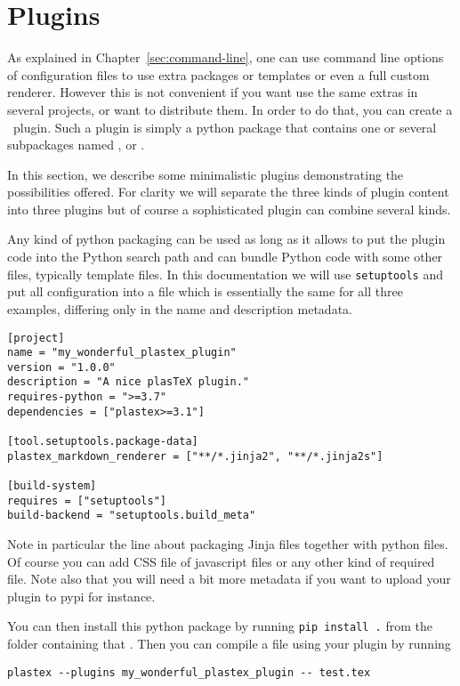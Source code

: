 \section{Plugins}
\label{sec:plugins}

As explained in Chapter~\ref{sec:command-line}, one can use command line
options of configuration files to use extra packages or templates or even a
full custom renderer.
However this is not convenient if you want use the same extras in several
projects, or want to distribute them. In order to do that, you can create a
\plasTeX\ plugin. Such a plugin is simply a python package that contains
one or several subpackages named ,  or
.

In this section, we describe some minimalistic plugins demonstrating the
possibilities offered. For clarity we will separate the three kinds of plugin content
into three plugins but of course a sophisticated plugin can combine several kinds.

Any kind of python packaging can be used as long as it allows to put the plugin code into
the Python search path and can bundle Python code with some other files, typically template files.
In this documentation we will use \texttt{setuptools} and put all configuration into
a  file which is essentially the same for all three examples,
differing only in the name and description metadata.
\begin{lstlisting}
[project]
name = "my_wonderful_plastex_plugin"
version = "1.0.0"
description = "A nice plasTeX plugin."
requires-python = ">=3.7"
dependencies = ["plastex>=3.1"]

[tool.setuptools.package-data]
plastex_markdown_renderer = ["**/*.jinja2", "**/*.jinja2s"]

[build-system]
requires = ["setuptools"]
build-backend = "setuptools.build_meta"
\end{lstlisting}

Note in particular the line about packaging Jinja files together with python files. Of course
you can add CSS file of javascript files or any other kind of required file.
Note also that you will need a bit more metadata if you want to upload your
plugin to pypi for instance.

You can then install this python package by running \verb+pip install .+ from the folder
containing that . Then you can compile a file  using your plugin by running

\begin{verbatim}
plastex --plugins my_wonderful_plastex_plugin -- test.tex
\end{verbatim}

